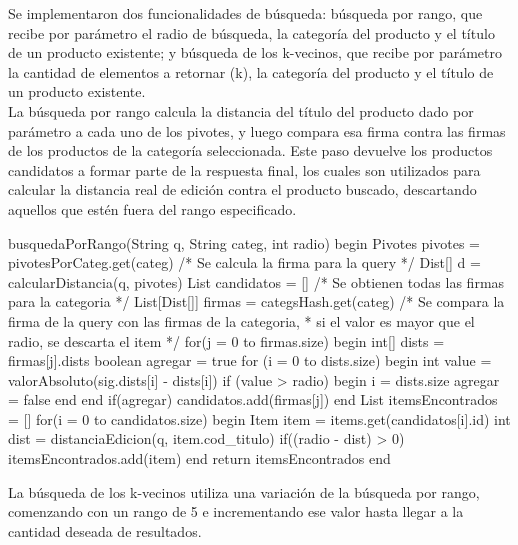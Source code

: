 Se implementaron dos funcionalidades de b\'usqueda: b\'usqueda por rango, que recibe por par\'ametro el radio de b\'usqueda, la categor\'ia del producto y el t\'itulo de un producto existente; y b\'usqueda de los k-vecinos, que recibe por par\'ametro la cantidad de elementos a retornar (k), la categor\'ia del producto y el t\'itulo de un producto existente.\\

La b\'usqueda por rango calcula la distancia del t\'itulo del producto dado por par\'ametro a cada uno de los pivotes, y luego compara esa firma contra las firmas de los productos de la categor\'ia seleccionada. Este paso devuelve los productos candidatos a formar parte de la respuesta final, los cuales son utilizados para calcular la distancia real de edici\'on contra el producto buscado, descartando aquellos que est\'en fuera del rango especificado.\\

\begin{algorithm}[caption={B\'usqueda por rango}, label={alg4}]
busquedaPorRango(String q, String categ, int radio)
begin
 Pivotes pivotes = pivotesPorCateg.get(categ)
 /* Se calcula la firma para la query */
 Dist[] d = calcularDistancia(q, pivotes)
 List candidatos = []
 /* Se obtienen todas las firmas para la categoria */
 List[Dist[]] firmas = categsHash.get(categ)
 /* Se compara la firma de la query con las firmas de la categoria, 
  * si el valor es mayor que el radio, se descarta el item */
 for(j = 0 to firmas.size)
 begin
  int[] dists = firmas[j].dists
  boolean agregar = true
  for (i = 0 to dists.size)
  begin
   int value = valorAbsoluto(sig.dists[i] - dists[i])
   if (value > radio)
   begin
    i = dists.size
    agregar = false
   end
  end
  if(agregar)
   candidatos.add(firmas[j])
 end
 List itemsEncontrados = []
 for(i = 0 to candidatos.size)
 begin
  Item item = items.get(candidatos[i].id)
  int dist = distanciaEdicion(q, item.cod_titulo)
  if((radio - dist) > 0)
   itemsEncontrados.add(item)
 end
 return itemsEncontrados
end
\end{algorithm}

La b\'usqueda de los k-vecinos utiliza una variaci\'on de la b\'usqueda por rango, comenzando con un rango de 5 e incrementando ese valor hasta llegar a la cantidad deseada de resultados.\\

